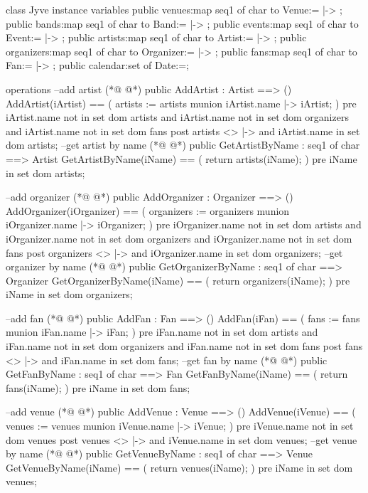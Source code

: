 \begin{vdmpp}[breaklines=true]

class Jyve
instance variables
  public venues:map seq1 of char to Venue:={ |-> };
  public bands:map seq1 of char to Band:={ |-> };
  public events:map seq1 of char to Event:={ |-> };
  public artists:map seq1 of char to Artist:={ |-> };
  public organizers:map seq1 of char to Organizer:={ |-> };
  public fans:map seq1 of char to Fan:={ |-> };
  public calendar:set of Date:={};

operations
 --add artist
(*@
\label{AddArtist:14}
@*)
  public  AddArtist : Artist  ==> ()
  AddArtist(iArtist) == (
    artists := artists munion {iArtist.name |-> iArtist};
 )
  pre 
   iArtist.name not in set dom artists and
   iArtist.name not in set dom organizers and
   iArtist.name not in set dom fans
  post 
  artists <> { |-> } and iArtist.name in set dom artists;
  --get artist by name
(*@
\label{GetArtistByName:25}
@*)
  public GetArtistByName : seq1 of char ==> Artist
  GetArtistByName(iName) == (
   return artists(iName);
  )
  pre 
   iName in set dom artists;
  
  
  --add organizer
(*@
\label{AddOrganizer:34}
@*)
  public  AddOrganizer : Organizer  ==> ()
  AddOrganizer(iOrganizer) == (
    organizers := organizers munion {iOrganizer.name |-> iOrganizer};
 )
  pre 
   iOrganizer.name not in set dom artists and
   iOrganizer.name not in set dom organizers and
   iOrganizer.name not in set dom fans
  post 
  organizers <> { |-> } and iOrganizer.name in set dom organizers;
  --get organizer by name
(*@
\label{GetOrganizerByName:45}
@*)
  public GetOrganizerByName : seq1 of char ==> Organizer
  GetOrganizerByName(iName) == (
   return organizers(iName);
  )
  pre
   iName in set dom organizers;
   
   
 --add fan
(*@
\label{AddFan:54}
@*)
  public  AddFan : Fan  ==> ()
  AddFan(iFan) == (
    fans := fans munion {iFan.name |-> iFan};
 )
  pre 
   iFan.name not in set dom artists and
   iFan.name not in set dom organizers and
   iFan.name not in set dom fans
  post 
  fans <> { |-> } and iFan.name in set dom fans;
  --get fan by name
(*@
\label{GetFanByName:65}
@*)
  public GetFanByName : seq1 of char ==> Fan
  GetFanByName(iName) == (
   return fans(iName);
  )
  pre iName in set dom fans;

   
 --add venue
(*@
\label{AddVenue:73}
@*)
  public  AddVenue : Venue  ==> ()
  AddVenue(iVenue) == (
    venues := venues munion {iVenue.name |-> iVenue};
 )
  pre
   iVenue.name not in set dom venues
  post 
  venues <> { |-> } and iVenue.name in set dom venues;
  --get venue by name
(*@
\label{GetVenueByName:82}
@*)
  public GetVenueByName : seq1 of char ==> Venue
  GetVenueByName(iName) == (
   return venues(iName);
  )
  pre iName in set dom venues;
   

\end{vdmpp}
